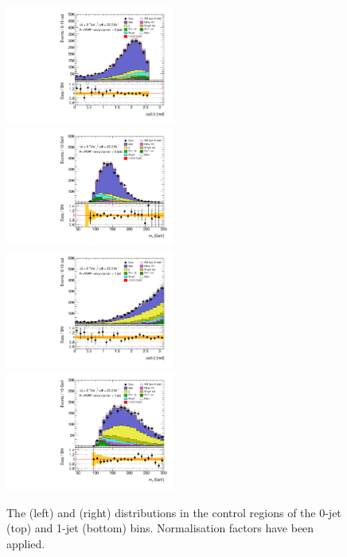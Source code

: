 \begin{figure}[t]
	\includegraphics[width=0.495\textwidth]{tex/ww/emme_CutWWControl_0jet_DPhill_mh125_lin}
	\hfill
	\includegraphics[width=0.495\textwidth]{tex/ww/emme_CutWWControl_0jet_MT_TrackHWW_Clj_mh125_lin}
	\\
	\includegraphics[width=0.495\textwidth]{tex/ww/emme_CutWWControl_1jet_DPhill_mh125_lin}
	\hfill
	\includegraphics[width=0.495\textwidth]{tex/ww/emme_CutWWControl_1jet_MT_TrackHWW_Clj_mh125_lin}
	\caption{The \dphill (left) and \mt (right) distributions in the \WW control regions 
	of the 0-jet (top) and 1-jet (bottom) bins. Normalisation factors have been applied.}
	\label{fig:ww_bkg:cr_plots}
\end{figure}


